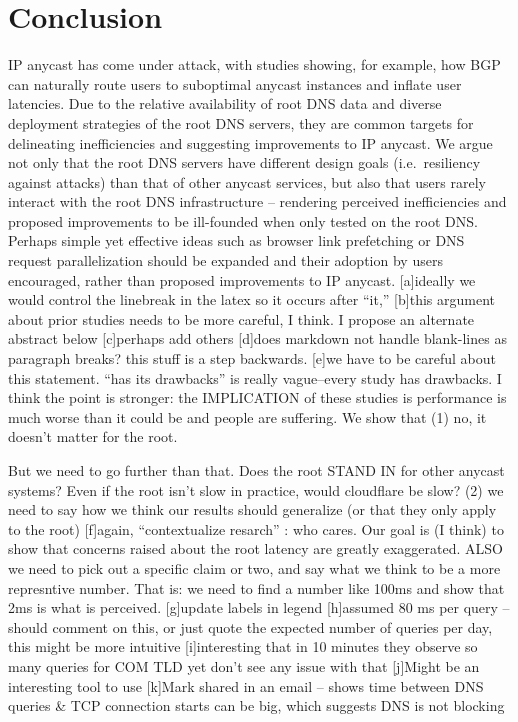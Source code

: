 \documentclass[sigconf,nonacm,10pt]{acmart}
\begin{document}
\fi

\section{Conclusion}\label{conclusion-1}

IP anycast has come under attack, with studies showing, for example, how
BGP can naturally route users to suboptimal anycast instances and
inflate user latencies. Due to the relative availability of root DNS
data and diverse deployment strategies of the root DNS servers, they are
common targets for delineating inefficiencies and suggesting
improvements to IP anycast. We argue not only that the root DNS servers
have different design goals (i.e.~resiliency against attacks) than that
of other anycast services, but also that users rarely interact with the
root DNS infrastructure -- rendering perceived inefficiencies and
proposed improvements to be ill-founded when only tested on the root
DNS. Perhaps simple yet effective ideas such as browser link prefetching
or DNS request parallelization should be expanded and their adoption by
users encouraged, rather than proposed improvements to IP anycast.
{[}a{]}ideally we would control the linebreak in the latex so it occurs
after ``it,'' {[}b{]}this argument about prior studies needs to be more
careful, I think. I propose an alternate abstract below {[}c{]}perhaps
add others {[}d{]}does markdown not handle blank-lines as paragraph
breaks? this \break\break stuff is a step backwards. {[}e{]}we have to
be careful about this statement. ``has its drawbacks'' is really
vague--every study has drawbacks. I think the point is stronger: the
IMPLICATION of these studies is performance is much worse than it could
be and people are suffering. We show that (1) no, it doesn't matter for
the root.

But we need to go further than that. Does the root STAND IN for other
anycast systems? Even if the root isn't slow in practice, would
cloudflare be slow? (2) we need to say how we think our results should
generalize (or that they only apply to the root) {[}f{]}again,
``contextualize resarch'' : who cares. Our goal is (I think) to show
that concerns raised about the root latency are greatly exaggerated.
ALSO we need to pick out a specific claim or two, and say what we think
to be a more represntive number. That is: we need to find a number like
100ms and show that 2ms is what is perceived. {[}g{]}update labels in
legend {[}h{]}assumed 80 ms per query -- should comment on this, or just
quote the expected number of queries per day, this might be more
intuitive {[}i{]}interesting that in 10 minutes they observe so many
queries for COM TLD yet don't see any issue with that {[}j{]}Might be an
interesting tool to use {[}k{]}Mark shared in an email -- shows time
between DNS queries \& TCP connection starts can be big, which suggests
DNS is not blocking


\end{document}
